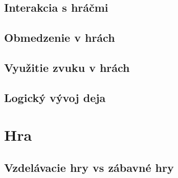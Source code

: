\documentclass[10pt,twoside,slovak,a4paper]{article}
\begin{document}
\subsection{Interakcia s hráčmi}

\subsection{Obmedzenie v hrách}

\subsection{Využitie zvuku v hrách}

\subsection{Logický vývoj deja}



\section{Hra}

\subsection{Vzdelávacie hry vs zábavné hry}




\end{document}
